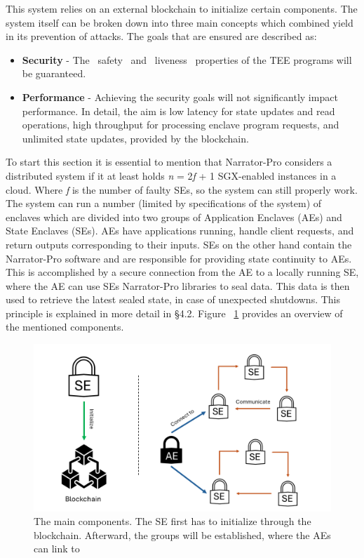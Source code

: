  

This system relies on an external blockchain to initialize certain components. The system itself can be broken down into three main concepts which combined yield in its prevention of attacks. The goals that are ensured are described as:
\begin{itemize}
     \item \textbf{Security} - The ~safety~ and ~liveness~ properties of the TEE programs will be guaranteed.
     \item \textbf{Performance} - Achieving the security goals will not significantly impact performance. In detail, the aim is low latency for state updates and read operations, high throughput for processing enclave program requests, and unlimited state updates, provided by the blockchain.
\end{itemize} 
To start this section it is essential to mention that Narrator-Pro considers a distributed system if it at least holds \textit{n} = 2\textit{f} + 1 SGX-enabled instances in a cloud. Where \textit{f} is the number of faulty SEs, so the system can still properly work. The system can run a number (limited by specifications of the system) of enclaves which are divided into two groups of Application Enclaves (AEs) and State Enclaves (SEs). AEs have applications running, handle client requests, and return outputs corresponding to their inputs. SEs on the other hand contain the Narrator-Pro software and are responsible for providing state continuity to AEs. This is accomplished by a secure connection from the AE to a locally running SE, where the AE can use SEs Narrator-Pro libraries to seal data. This data is then used to retrieve the latest sealed state, in case of unexpected shutdowns. This principle is explained in more detail in §4.2. Figure ~\ref{fig:1} provides an overview of the mentioned components.

\begin{figure}[h]
    \centering
    \includegraphics[width=\linewidth]{Figures/Figure1.png}
    \caption{The main components. The SE first has to initialize through the blockchain. Afterward, the groups will be established, where the AEs can link to}
    \label{fig:1}
\end{figure}


